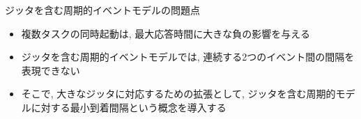 
\begin{frame}{ジッタを含む周期的イベントモデルの問題点}
    \begin{itemize}
        \item 複数タスクの同時起動は, 最大応答時間に大きな負の影響を与える
        \item ジッタを含む周期的イベントモデルでは, 連続する2つのイベント間の間隔を表現できない
        \item そこで, 大きなジッタに対応するための拡張として, ジッタを含む周期的モデルに対する最小到着間隔という概念を導入する
    \end{itemize}
\end{frame}


